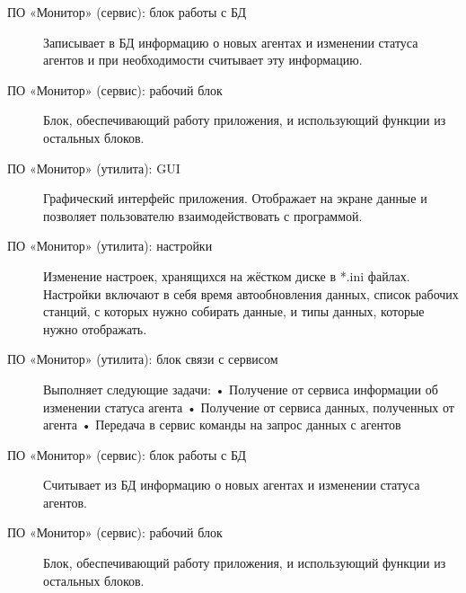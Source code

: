 \begin{description}
\item[ПО «Монитор» (сервис): блок работы с БД]

Записывает в БД информацию о новых агентах и изменении статуса агентов и при необходимости считывает эту информацию.
\item[ПО «Монитор» (сервис): рабочий блок]

Блок, обеспечивающий работу приложения, и использующий функции из остальных блоков.
\item[ПО «Монитор» (утилита): GUI]

Графический интерфейс приложения. Отображает на экране данные и позволяет пользователю взаимодействовать с программой.
\item[ПО «Монитор» (утилита): настройки]

Изменение настроек, хранящихся на жёстком диске в *.ini файлах. Настройки включают в себя время автообновления данных, список рабочих станций, с которых нужно собирать данные, и типы данных, которые нужно отображать.
\item[ПО «Монитор» (утилита): блок связи с сервисом]

Выполняет следующие задачи:
•	Получение от сервиса информации об изменении статуса агента
•	Получение от сервиса данных, полученных от агента
•	Передача в сервис команды на запрос данных с агентов

\item[ПО «Монитор» (сервис): блок работы с БД]

Считывает из БД информацию о новых агентах и изменении статуса агентов.
\item[ПО «Монитор» (сервис): рабочий блок]

Блок, обеспечивающий работу приложения, и использующий функции из остальных блоков.

\end{description}